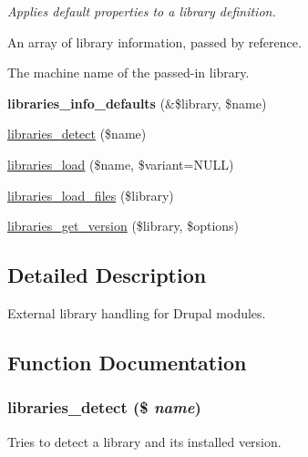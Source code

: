 \begin{Indent}{\bf }\par
{\em \label{_amgrpd41d8cd98f00b204e9800998ecf8427e}
 Applies default properties to a library definition.

An array of library information, passed by reference.

The machine name of the passed-\/in library. }\begin{DoxyCompactItemize}
\item 
\hypertarget{libraries_8module_ade9f53d8a3f6722c779f7c9626149bd2}{
{\bfseries libraries\_\-info\_\-defaults} (\&\$library, \$name)}
\label{libraries_8module_ade9f53d8a3f6722c779f7c9626149bd2}

\item 
\hyperlink{libraries_8module_a6d07b527dfd01c1b2e599a6e07234cec}{libraries\_\-detect} (\$name)
\item 
\hyperlink{libraries_8module_a015c6cdcfc3a14262a48dcfe344a70de}{libraries\_\-load} (\$name, \$variant=NULL)
\item 
\hyperlink{libraries_8module_a3e44d0658472eaa5363ecbee0dc61433}{libraries\_\-load\_\-files} (\$library)
\item 
\hyperlink{libraries_8module_a75db4e86addc3ceb4df8d0e1f5a54f99}{libraries\_\-get\_\-version} (\$library, \$options)
\end{DoxyCompactItemize}
\end{Indent}


\subsection{Detailed Description}
External library handling for Drupal modules. 

\subsection{Function Documentation}
\hypertarget{libraries_8module_a6d07b527dfd01c1b2e599a6e07234cec}{
\subsubsection[{libraries\_\-detect}]{\setlength{\rightskip}{0pt plus 5cm}libraries\_\-detect (\$ {\em name})}}
\label{libraries_8module_a6d07b527dfd01c1b2e599a6e07234cec}
Tries to detect a library and its installed version.



